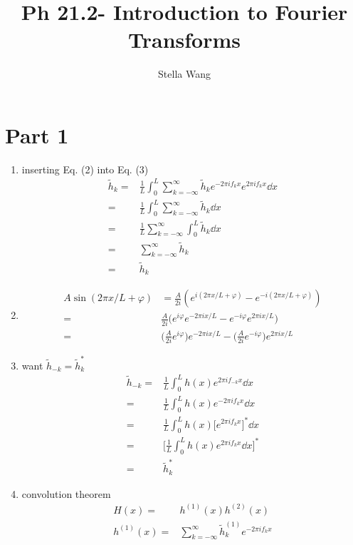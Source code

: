 \documentclass{article}
\title{Ph 21.2- Introduction to Fourier Transforms}
\author{Stella Wang}
\begin{document}
	\maketitle
\section{Part 1}
\begin{enumerate}
	\item inserting Eq. (2) into Eq. (3)
	\begin{align}
		 \tilde h_k =&\frac{1}{L} \int_0^L \sum_{k=-\infty}^{\infty} \tilde h_k e^{-2\pi i f_k x}   e^{2\pi i f_k x} \dd{x} \\
		 =& \frac{1}{L} \int_0^L \sum_{k=-\infty}^{\infty} \tilde h_k \dd{x} \\
		 =& \frac{1}{L} \sum_{k=-\infty}^{\infty}  \int_0^L \tilde h_k \dd{x} \\
		 =& \sum_{k=-\infty}^{\infty} \tilde h_k \\
		 =&\tilde h_k 
	\end{align}
	\item 
	\begin{align}
		A\sin (2 \pi x/L + \varphi) &= \frac{A}{2i}(e^{i(2 \pi x/L + \varphi)} - e^{-i(2 \pi x/L + \varphi)}) \\
		=& \frac{A}{2i} \big(e^{i \varphi} e^{-2 \pi i x/L} - e^{-i \varphi} e^{2 \pi i x/L}\big) \\
		=& \bigg(\frac{A}{2i} e^{i \varphi}\bigg) e^{-2 \pi i x/L} - \bigg(\frac{A}{2i} e^{-i \varphi}\bigg) e^{2 \pi i x/L}
	\end{align}
	\item want \(\tilde h_{-k} = \tilde h_k^*\)
	\begin{align}
		\tilde h_{-k} =& \frac{1}{L} \int_0^L h(x) e^{2 \pi i f_{-k} x} \dd{x} \\
		=& \frac{1}{L} \int_0^L h(x) e^{-2 \pi i f_{k} x} \dd{x} \\
		=& \frac{1}{L} \int_0^L h(x) \big[ e^{2 \pi i f_{k} x} \big]^{*} \dd{x} \\
		=& \bigg[ \frac{1}{L} \int_0^L h(x) e^{2 \pi i f_{k} x} \dd{x} \bigg]^{*} \\
		=& \tilde h_k^*
	\end{align}
	\item convolution theorem 
	\begin{align}
		H(x) =& h^{(1)}(x) h^{(2)}(x) \\
		h^{(1)}(x) =& \sum_{k=-\infty}^{\infty} \tilde h_k^{(1)} e^{-2 \pi i f_k x} \\

\end{align}
\end{enumerate}
\end{document}
